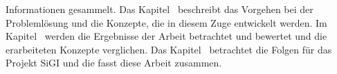 Informationen gesammelt. Das Kapitel~ beschreibt das Vorgehen bei der Problemlösung und die Konzepte, die in diesem Zuge entwickelt werden. Im Kapitel~ werden die Ergebnisse der Arbeit betrachtet und bewertet und die erarbeiteten Konzepte verglichen. Das Kapitel~ betrachtet die Folgen für das Projekt SiGI und die  fasst diese Arbeit zusammen. 
